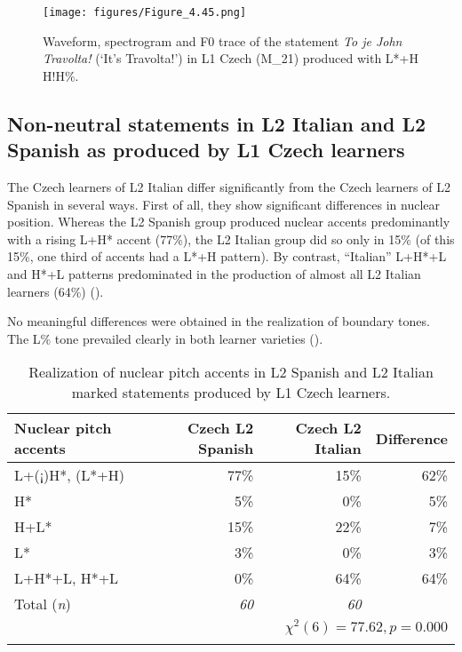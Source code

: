\begin{figure}
\texttt{[image: figures/Figure\_4.45.png]}
\caption{Waveform, spectrogram and F0 trace of the statement \textit{To je John Travolta!} (‘It’s Travolta!’) in L1 Czech (M\_21) produced with L*+H H!H\%.}
\label{fig:4.45}
\end{figure}

\subsection{Non-neutral statements in L2 Italian and L2 Spanish as produced by L1 Czech learners}\label{sec:4.2.3}\largerpage

The Czech learners of L2 Italian differ significantly from the Czech learners of L2 Spanish in several ways. First of all, they show significant differences in nuclear position. Whereas the L2 Spanish group produced nuclear accents predominantly with a rising L+H* accent (77\%), the L2 Italian group did so only in 15\% (of this 15\%, one third of accents had a L*+H pattern). By contrast, “Italian” L+H*+L and H*+L patterns predominated in the production of almost all L2 Italian learners (64\%) ().

No meaningful differences were obtained in the realization of boundary tones. The L\% tone prevailed clearly in both learner varieties ().\pagebreak

\begin{table}
\begin{tabularx}{\textwidth}{Qrrr}

\lsptoprule

{Nuclear pitch accents} & {Czech L2 Spanish} & {Czech L2 Italian} & {Difference}\\
\midrule
L+(¡)H*, (L*+H) &  77\% &  15\% &  62\%\\
H* &  5\% &  0\% & 5\%\\
H+L* &  15\% &  22\% &  7\%\\
L* &  3\% &  0\% & 3\%\\
L+H*+L, H*+L &  0\% & 64\% &  64\%\\
\midrule
Total (\textit{n}) & {\itshape 60} & {\itshape 60} &  \\
\\
\lspbottomrule
\end{tabularx}

\caption{Realization of nuclear pitch accents in L2 Spanish and L2 Italian marked statements produced by L1 Czech learners.}
\label{tab:4.14}
\end{table}

